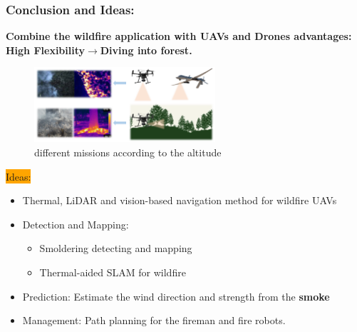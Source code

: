 \begin{frame}
    \frametitle{Conclusion and Ideas:}
    \textbf{Combine the wildfire application with UAVs and Drones advantages: High
    Flexibility$\rightarrow$Diving into forest.}
    \begin{figure}[H]
        \centering
        \includegraphics[width=0.6\textwidth]{./imgs/high_low.png}
        \caption{different missions according to the altitude}
        \label{1}
    \end{figure}
    \colorbox{orange}{Ideas:}
    \begin{itemize}
        \item Thermal, LiDAR and vision-based navigation method for wildfire UAVs
        \item Detection and Mapping:
            \begin{itemize}
                \item Smoldering detecting and mapping
                \item Thermal-aided SLAM for wildfire
            \end{itemize}
        \item Prediction:
            Estimate the wind direction and strength from the \textbf{smoke}
        \item Management:
            Path planning for the fireman and fire robots.
    \end{itemize}


\end{frame}
